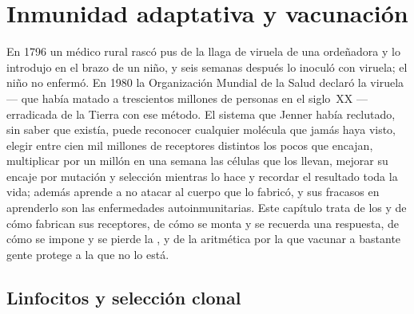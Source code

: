\chapter{Inmunidad adaptativa y vacunación}\label{ch:b3:adaptive-immunity}

En 1796 un médico rural rascó pus de la llaga de viruela  de una
ordeñadora y lo introdujo en el brazo de un niño, y seis semanas después
lo inoculó con viruela; el niño no enfermó. En 1980 la Organización
Mundial de la Salud declaró la viruela --- que había matado a trescientos
millones de personas en el siglo~XX --- erradicada de la Tierra con ese
método. El sistema que Jenner había reclutado, sin saber que existía,
puede reconocer cualquier molécula que jamás haya visto, elegir entre cien
mil millones de receptores distintos los pocos que encajan, multiplicar
por un millón en una semana las células que los llevan, mejorar su encaje
por mutación y selección mientras lo hace y recordar el resultado toda la
vida; además aprende a no atacar al cuerpo que lo fabricó, y sus fracasos
en aprenderlo son las enfermedades autoinmunitarias. Este capítulo trata
de los  y de cómo fabrican sus receptores, de cómo se monta y
se recuerda una respuesta, de cómo se impone y se pierde la , y
de la aritmética por la que vacunar a bastante gente protege a la que no
lo está.

\section{Linfocitos y selección clonal}

